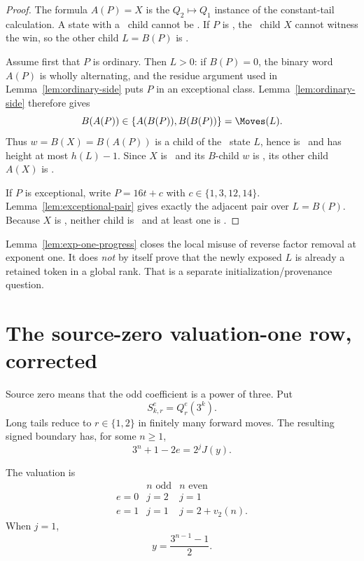 \begin{proof}
The formula $A(P)=X$ is the $Q_2\mapsto Q_1$ instance of the constant-tail
calculation.  A state with a \DRAW\ child cannot be \LOSS.  If $P$ is
\WIN, the \DRAW\ child $X$ cannot witness the win, so the other child
$L=B(P)$ is \LOSS.

Assume first that $P$ is ordinary.  Then $L>0$: if $B(P)=0$, the
binary word $A(P)$ is wholly alternating, and the residue argument used in
Lemma~\ref{lem:ordinary-side} puts $P$ in an exceptional class.
Lemma~\ref{lem:ordinary-side} therefore gives
\[
 B(A(P))\in\{A(B(P)),B(B(P))\}=\Moves(L).
\]
Thus $w=B(X)=B(A(P))$ is a child of the \LOSS\ state $L$, hence is \WIN\
and has height at most $h(L)-1$.  Since $X$ is \DRAW\ and its $B$-child
$w$ is \WIN, its other child $A(X)$ is \DRAW.

If $P$ is exceptional, write $P=16t+c$ with
$c\in\{1,3,12,14\}$.  Lemma~\ref{lem:exceptional-pair} gives exactly the adjacent pair over $L=B(P)$.
Because $X$ is \DRAW, neither child is \LOSS\ and at least one is \DRAW.
\end{proof}

\begin{remark}
Lemma~\ref{lem:exp-one-progress} closes the local misuse of reverse factor
removal at exponent one.  It does \emph{not} by itself prove that the newly
exposed $L$ is already a retained token in a global rank.  That is a
separate initialization/provenance question.
\end{remark}

\section{The source-zero valuation-one row, corrected}

Source zero means that the odd coefficient is a power of three.  Put
\[
  S_{k,r}^e=Q_r^e(3^k).
\]
Long tails reduce to $r\in\{1,2\}$ in finitely many forward moves.  The
resulting signed boundary has, for some $n\ge1$,
\[
  3^n+1-2e=2^j J(y).
\]

\begin{lemma}\label{lem:zero-table}
The valuation is
\[
\begin{array}{c|cc}
 &n\text{ odd}&n\text{ even}\\ \hline
 e=0&j=2&j=1\\
 e=1&j=1&j=2+v_2(n).
\end{array}
\]
When $j=1$,
\[
  y=\frac{3^{n-1}-1}{2}.
\]
\end{lemma}

